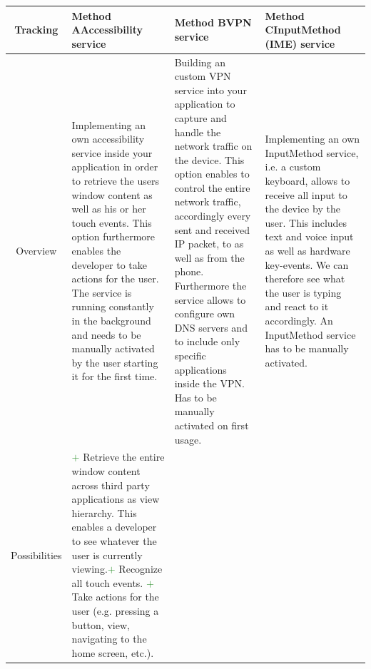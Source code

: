 \begin{table}
	\fontsize{9pt}{13pt}\selectfont
	\hspace{-5pt}
	\vspace{2pt}
	\begin{tabularx}{\textwidth + 5pt}{| @{\hspace{3pt}} c || @{\hspace{3pt}} M | @{\hspace{3pt}} M | @{\hspace{3pt}} M|}
		\hline
		\textbf{Tracking} & \textbf{Method A}\newline Accessibility service & \textbf{Method B}\newline VPN service & \textbf{Method C}\newline InputMethod (IME) service\\
		\hline
		\hline
		Overview & 
		Implementing an own accessibility service inside your application in order to retrieve the users window content as well as his or her touch events. This option furthermore enables the developer to take actions for the user. The service is running constantly in the background and needs to be manually activated by the user starting it for the first time. &
		Building an custom VPN service into your application to capture and handle the network traffic on the device. This option enables to control the entire network traffic, accordingly every sent and received IP packet, to as well as from the phone. Furthermore the service allows to configure own DNS servers and to include only specific applications inside the VPN. Has to be manually activated on first usage. &
		Implementing an own InputMethod service, i.e. a custom keyboard, allows to receive all input to the device by the user. This includes text and voice input as well as hardware key-events. We can therefore see what the user is typing and react to it accordingly. An InputMethod service has to be manually activated.\\
		\hline
		Possibilities & 
		\textcolor{ForestGreen}{\fontsize{12pt}{13pt}\boldmath$+$} Retrieve the entire window content across third party applications as view hierarchy. This enables a developer to see whatever the user is currently viewing.\newline\textcolor{ForestGreen}{\fontsize{12pt}{13pt}\boldmath$+$} Recognize all touch events. \newline\textcolor{ForestGreen}{\fontsize{12pt}{13pt}\boldmath$+$} Take actions for the user (e.g. pressing a button, view, navigating to the home screen, etc.). &

\end{tabularx}
\end{table}
